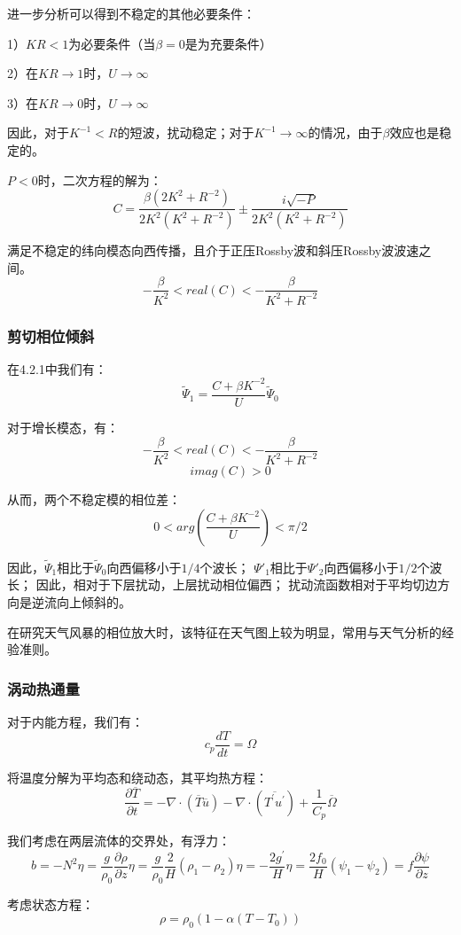 \documentclass{article}
\begin{document}
进一步分析可以得到不稳定的其他必要条件：

1）$KR<1$为必要条件（当$\beta=0$是为充要条件）

2）在$KR \rightarrow 1$时，$U \rightarrow \infty$

3）在$KR \rightarrow 0$时，$U \rightarrow \infty$

因此，对于$K^{-1}<R$的短波，扰动稳定；对于$K^{-1}\rightarrow\infty$的情况，由于$\beta$效应也是稳定的。

$P<0$时，二次方程的解为：
$$C = \frac{\beta(2K^2+R^{-2})}{2K^2(K^2+R^{-2})}\pm\frac{i\sqrt{-P}}{2K^2(K^2+R^{-2})}$$

满足不稳定的纬向模态向西传播，且介于正压Rossby波和斜压Rossby波波速之间。
$$-\frac{\beta}{K^2}<real(C)<-\frac{\beta}{K^2+R^{-2}}$$


\subsubsection{剪切相位倾斜}
在4.2.1中我们有：
$$\tilde{\Psi}_1=\frac{C +\beta K^{-2}}{U}\tilde{\Psi}_0 $$

对于增长模态，有：
$$-\frac{\beta}{K^2}<real(C)<-\frac{\beta}{K^2+R^{-2}}$$
$$imag(C)>0$$

从而，两个不稳定模的相位差：
$$0<arg(\frac{C +\beta K^{-2}}{U})<\pi/2$$

因此，$\tilde{\Psi}_1$相比于$\tilde{\Psi}_0$向西偏移小于$1/4$个波长；
$\Psi'_1$相比于$\Psi'_2$向西偏移小于$1/2$个波长；
因此，相对于下层扰动，上层扰动相位偏西；
扰动流函数相对于平均切边方向是逆流向上倾斜的。

在研究天气风暴的相位放大时，该特征在天气图上较为明显，常用与天气分析的经验准则。

\subsubsection{涡动热通量}
对于内能方程，我们有：
$$c_p\frac{dT}{dt}=\Omega$$

将温度分解为平均态和绕动态，其平均热方程：
$$\frac{\partial \overline{T}}{\partial t}=-\nabla \cdot (\overline{T}\overline{u})-\nabla \cdot (\overline{{T}^{\prime}{u}^{\prime}})+\frac{1}{{{C}_{p}}}\overline{\Omega }$$

我们考虑在两层流体的交界处，有浮力：
$$b = -N^2\eta = \frac{g}{\rho_0}\frac{\partial \rho}{\partial z}\eta = \frac{g}{\rho_0}\frac{2}{H}(\rho_1-\rho_2)\eta=-\frac{2g^{\prime}}{H}\eta =\frac{2f_0}{H}(\psi_1-\psi_2)=f\frac{\partial \psi}{\partial z} $$

考虑状态方程：
$$\rho = \rho_0(1-\alpha(T-T_0))$$
\end{document}
